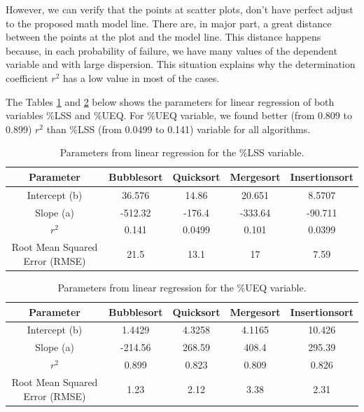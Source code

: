   However, we can verify that the points at scatter plots, don't have perfect adjust to the proposed math model line. There are, in major part, a great distance between the points at the plot and the model line. This distance happens because, in each probability of failure, we have many values of the dependent variable and with large dispersion. This situation explains why the determination coefficient $r^2$ has a low value in most of the cases.

  The Tables \ref{table-linear-regression-lss} and \ref{table-linear-regression-ueq} below shows the parameters for linear regression of both variables \%LSS and \%UEQ. For \%UEQ variable, we found better (from 0.809 to 0.899) $r^2$ than \%LSS (from 0.0499 to 0.141) variable for all algorithms.

  \begin{table}[H]
    \caption{Parameters from linear regression for the \%LSS variable.}
    \begin{center}
    \begin{tabular}{|c|c|c|c|c|}
    \hline
    \textbf{Parameter} & \textbf{Bubblesort} & \textbf{Quicksort} & \textbf{Mergesort} & \textbf{Insertionsort} \\
    \hline
    Intercept (b) & 36.576 & 14.86 & 20.651 & 8.5707 \\
    \hline
    Slope (a) & -512.32 & -176.4 & -333.64 & -90.711 \\
    \hline
    $r^2$ & 0.141 & 0.0499 & 0.101 & 0.0399 \\
    \hline
    Root Mean Squared Error (RMSE) & 21.5 & 13.1 & 17 & 7.59 \\
    \hline
    \end{tabular}
    \label{table-linear-regression-lss}
    \end{center}
\end{table}

\begin{table}[H]
    \caption{Parameters from linear regression for the \%UEQ variable.}
    \begin{center}
    \begin{tabular}{|c|c|c|c|c|}
    \hline
    \textbf{Parameter} & \textbf{Bubblesort} & \textbf{Quicksort} & \textbf{Mergesort} & \textbf{Insertionsort} \\
    \hline
    Intercept (b) & 1.4429 & 4.3258 & 4.1165 & 10.426 \\
    \hline
    Slope (a) & -214.56 & 268.59 & 408.4 & 295.39 \\
    \hline
    $r^2$ & 0.899 & 0.823 & 0.809 & 0.826 \\
    \hline
    Root Mean Squared Error (RMSE) & 1.23 & 2.12 & 3.38 & 2.31 \\
    \hline
    \end{tabular}
    \label{table-linear-regression-ueq}
    \end{center}
\end{table}